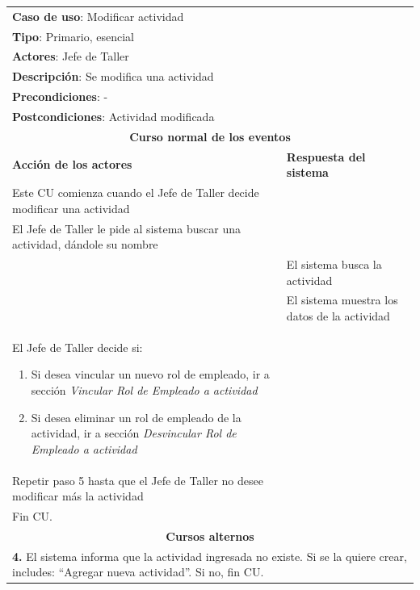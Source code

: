 \documentclass[12pt]{extarticle}
\begin{document}
\begin{spacing}{1.2}
    \setcounter{step}{0}


	\begin{longtable}{ |p{8cm}|p{8cm}| }
		\hline
		\multicolumn{2}{|p{16cm}|}{\textbf{Caso de uso}: Modificar actividad}\\
		\multicolumn{2}{|p{16cm}|}{\textbf{Tipo}: Primario, esencial}\\
		\multicolumn{2}{|p{16cm}|}{\textbf{Actores}: Jefe de Taller}\\
		\multicolumn{2}{|p{16cm}|}{\textbf{Descripción}: Se modifica una actividad}\\
		\multicolumn{2}{|p{16cm}|}{\textbf{Precondiciones}: -}\\
		\multicolumn{2}{|p{16cm}|}{\textbf{Postcondiciones}: Actividad modificada}\\
		\hline
		\multicolumn{2}{|c|}{\textbf{Curso normal de los eventos}}\\
		\hline
		\textbf{Acción de los actores} & \textbf{Respuesta del sistema}\\
		\hline
			\inc Este CU comienza cuando el Jefe de Taller decide modificar una actividad& \\
			\hline
			\inc El Jefe de Taller le pide al sistema buscar una actividad, dándole su nombre & \\
			\hline
			& \inc El sistema busca la actividad \\
			\hline
			& \inc El sistema muestra los datos de la actividad \\
			\hline
			\inc El Jefe de Taller decide si:
            \begin{enumerate}[label=(\alph*)]
                \item Si desea vincular un nuevo rol de empleado, ir a sección \textit{Vincular Rol de Empleado a actividad}
                \item Si desea eliminar un rol de empleado de la actividad, ir a sección \textit{Desvincular Rol de Empleado a actividad}
            \end{enumerate}        & \\
			\hline
			\inc  Repetir paso 5 hasta que el Jefe de Taller no desee modificar más la actividad& \\
			\hline
			\inc Fin CU. & \\
		\hline
		\multicolumn{2}{|c|}{\textbf{Cursos alternos}}\\
		\hline
        \multicolumn{2}{|p{16cm}|}{\textbf{4. }El sistema informa que la actividad ingresada no existe. Si se la quiere crear, includes: ``Agregar nueva actividad''. Si no, fin CU.}\\
		\hline
	\end{longtable}


\end{spacing}
\end{document}
